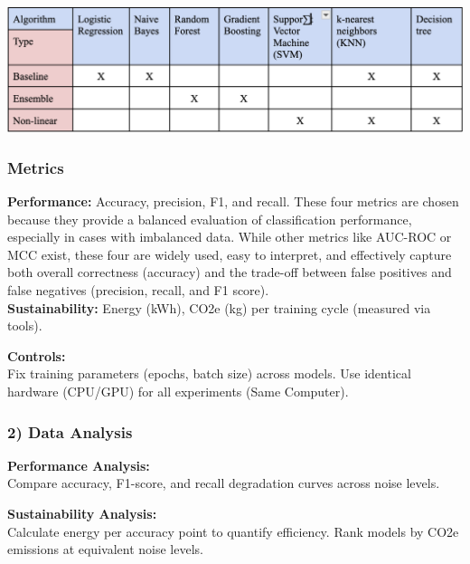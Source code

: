 \documentclass[conference]{IEEEtran}
\begin{document}
\begin{table}[htbp]
    \includegraphics[width=\linewidth, keepaspectratio]{img.png} %
    \caption{}
    \label{table:algorithms}
\end{table}




\subsubsection*{Metrics}
\newline

\textbf{Performance:} Accuracy, precision, F1, and recall. These four metrics are chosen because they provide a balanced evaluation of classification performance, especially in cases with imbalanced data. While other metrics like AUC-ROC or MCC exist, these four are widely used, easy to interpret, and effectively capture both overall correctness (accuracy) and the trade-off between false positives and false negatives (precision, recall, and F1 score).\\[0.5em]
\textbf{Sustainability:} Energy (kWh), CO2e (kg) per training cycle (measured via tools).

\vspace{0.5em}
\textbf{Controls:}\\
Fix training parameters (epochs, batch size) across models. Use identical hardware (CPU/GPU) for all experiments (Same Computer).

\vspace{0.5em}
\subsubsection*{2) Data Analysis}

\textbf{Performance Analysis:}\\
Compare accuracy, F1-score, and recall degradation curves across noise levels.

\vspace{0.5em}
\textbf{Sustainability Analysis:}\\
Calculate energy per accuracy point to quantify efficiency. Rank models by CO2e emissions at equivalent noise levels.
\end{document}
